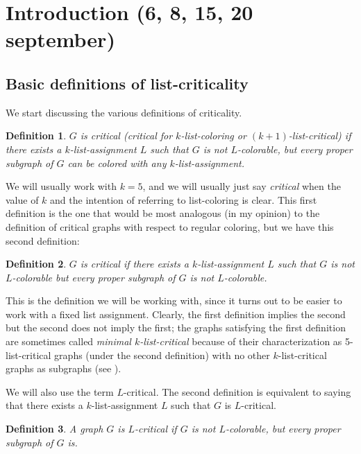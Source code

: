\documentclass{article}
\newtheorem{definition}{Definition}
\begin{document}
\tableofcontents
\newpage
\section{Introduction (6, 8, 15, 20 september)}

\subsection{Basic definitions of list-criticality}

We start discussing the various definitions of criticality.

\begin{definition}
$G$ is \emph{critical (critical for $k$-list-coloring or $(k+1)$-list-critical)} if there exists a $k$-list-assignment $L$ such that $G$ is not $L$-colorable, but every proper subgraph of $G$ can be colored with any $k$-list-assignment.
\end{definition}

We will usually work with $k = 5$, and we will usually just say \emph{critical} when the value of $k$ and the intention of referring to list-coloring is clear. This first definition is the one that would be most analogous (in my opinion) to the definition of critical graphs with respect to regular coloring, but we have this second definition:

\begin{definition}
$G$ is \emph{critical} if there exists a $k$-list-assignment $L$ such that $G$ is not $L$-colorable but every proper subgraph of $G$ is not $L$-colorable.
\end{definition}

This is the definition we will be working with, since it turns out to be easier to work with a fixed list assignment. Clearly, the first definition implies the second but the second does not imply the first; the graphs satisfying the first definition are sometimes called \textit{minimal $k$-list-critical} because of their characterization as 5-list-critical graphs (under the second definition) with no other $k$-list-critical graphs as subgraphs (see \cite{onlistcritical}).

We will also use the term $L$-critical. The second definition is equivalent to saying that there exists a $k$-list-assignment $L$ such that $G$ is $L$-critical.

\begin{definition}
A graph $G$ is \emph{$L$-critical} if $G$ is not $L$-colorable, but every proper subgraph of $G$ is.
\end{definition}
\end{document}

